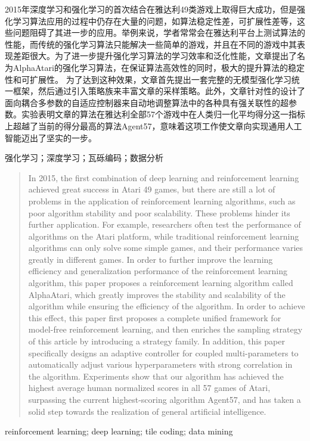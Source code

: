 

\begin{zhaiyao}
2015年深度学习和强化学习的首次结合在雅达利49类游戏上取得巨大成功，但是强化学习算法应用的过程中仍存在大量的问题，如算法稳定性差，可扩展性差等，这些问题阻碍了其进一步的应用。举例来说，学者常常会在雅达利平台上测试算法的性能，而传统的强化学习算法只能解决一些简单的游戏，并且在不同的游戏中其表现差距很大。为了进一步提升强化学习算法的学习效率和泛化性能，文章提出了名为AlphaAtari的强化学习算法，在保证算法高效性的同时，极大的提升算法的稳定性和可扩展性。
为了达到这种效果，文章首先提出一套完整的无模型强化学习统一框架，然后通过引入策略族来丰富文章的采样策略。此外，文章针对性的设计了面向耦合多参数的自适应控制器来自动地调整算法中的各种具有强关联性的超参数。实验表明文章的算法在雅达利全部57个游戏中在人类归一化平均得分这一指标上超越了当前的得分最高的算法Agent57，意味着这项工作使文章向实现通用人工智能迈出了坚实的一步。
\end{zhaiyao}




\begin{guanjianci}
强化学习；深度学习；瓦砾编码；数据分析
\end{guanjianci}



\begin{abstract}
In 2015, the first combination of deep learning and reinforcement learning achieved great success in Atari 49 games, but there are still a lot of problems in the application of reinforcement learning algorithms, such as poor algorithm stability and poor scalability. These problems hinder its further application. For example, researchers often test the performance of algorithms on the Atari platform, while traditional reinforcement learning algorithms can only solve some simple games, and their performance varies greatly in different games. In order to further improve the learning efficiency and generalization performance of the reinforcement learning algorithm, this paper proposes a reinforcement learning algorithm called AlphaAtari, which greatly improves the stability and scalability of the algorithm while ensuring the efficiency of the algorithm.
In order to achieve this effect, this paper first proposes a complete unified framework for model-free reinforcement learning, and then enriches the sampling strategy of this article by introducing a strategy family. In addition, this paper specifically designs an adaptive controller for coupled multi-parameters to automatically adjust various hyperparameters with strong correlation in the algorithm. Experiments show that our algorithm has achieved the highest average human normalized  scores in all 57 games of Atari, surpassing the current highest-scoring algorithm Agent57, and has taken a solid step towards the realization of general artificial intelligence.
\end{abstract}



\begin{keywords}
reinforcement learning; deep learning; tile coding; data mining
\end{keywords} 